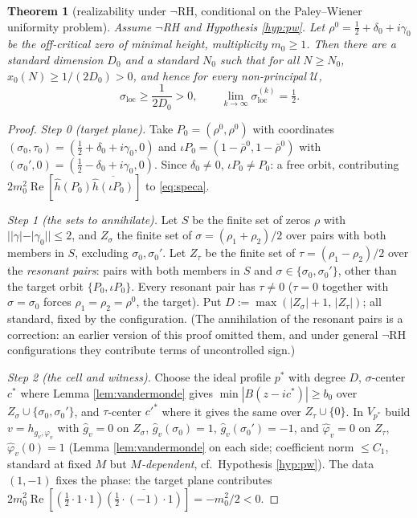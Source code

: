 \documentclass[11pt,reqno]{amsart}
\newtheorem{theorem}{Theorem}[section]
\theoremstyle{definition}
\newcommand{\half}{\tfrac12}
\begin{document}
\begin{theorem}[realizability under \(\neg\)RH, conditional on the Paley--Wiener uniformity problem]
\label{thm:realiz}
Assume \(\neg\)RH \emph{and Hypothesis \ref{hyp:pw}}. Let
\(\rho^0=\half+\delta_0+i\gamma_0\) be the off-critical
zero of minimal height, multiplicity \(m_0\geq1\). Then there are a standard
dimension \(D_0\) and a standard \(N_0\) such that for all \(N\geq N_0\),
\(x_0(N)\geq 1/(2D_0)>0\), and hence for every non-principal \(\mathcal U\),
\[
\sigma_{\mathrm{loc}}\geq\frac{1}{2D_0}>0,\qquad
\lim_{k\to\infty}\sigma_{\mathrm{loc}}^{(k)}=\tfrac12.
\]
\end{theorem}

\begin{proof}
\emph{Step 0 (target plane).} Take \(P_0=(\rho^0,\rho^0)\) with coordinates
\((\sigma_0,\tau_0)=(\half+\delta_0+i\gamma_0,0)\) and
\(\iota P_0=(1-\bar\rho^0,1-\bar\rho^0)\) with
\((\sigma_0',0)=(\half-\delta_0+i\gamma_0,0)\). Since \(\delta_0\neq0\),
\(\iota P_0\neq P_0\): a free orbit, contributing
\(2m_0^2\operatorname{Re}[\hat h(P_0)\overline{\hat h(\iota P_0)}]\) to
\eqref{eq:speca}.

\emph{Step 1 (the sets to annihilate).} Let \(S\) be the finite set of zeros
\(\rho\) with \(||\gamma|-|\gamma_0||\leq2\), and \(Z_\sigma\) the finite set of
\(\sigma=(\rho_1+\rho_2)/2\) over pairs with both members in \(S\), excluding
\(\sigma_0,\sigma_0'\). Let \(Z_\tau\) be the finite set of
\(\tau=(\rho_1-\rho_2)/2\) over the \emph{resonant pairs}: pairs with both
members in \(S\) and \(\sigma\in\{\sigma_0,\sigma_0'\}\), other than the target
orbit \(\{P_0,\iota P_0\}\). Every resonant pair has \(\tau\neq0\) (\(\tau=0\)
together with \(\sigma=\sigma_0\) forces \(\rho_1=\rho_2=\rho^0\), the target).
Put \(D:=\max(|Z_\sigma|+1,\,|Z_\tau|)\); all standard, fixed by the
configuration. \textup{(}The annihilation of the resonant pairs is a correction:
an earlier version of this proof omitted them, and under general
\(\neg\)RH configurations they contribute terms of uncontrolled
sign.\textup{)}

\emph{Step 2 (the cell and witness).} Choose the ideal profile \(p^*\) with
degree \(D\), \(\sigma\)-center \(c^*\) where Lemma \ref{lem:vandermonde} gives
\(\min|B(z-ic^*)|\geq b_0\) over \(Z_\sigma\cup\{\sigma_0,\sigma_0'\}\), and
\(\tau\)-center \(c'^*\) where it gives the same over \(Z_\tau\cup\{0\}\). In
\(V_{p^*}\) build \(v=h_{g_v,\varphi_v}\) with
\(\hat g_v=0\) on \(Z_\sigma\), \(\hat g_v(\sigma_0)=1\),
\(\hat g_v(\sigma_0')=-1\), and \(\hat\varphi_v=0\) on \(Z_\tau\),
\(\hat\varphi_v(0)=1\) (Lemma \ref{lem:vandermonde} on each side; coefficient
norm \(\leq C_1\), standard at fixed \(M\) but \emph{\(M\)-dependent}, cf.\
Hypothesis \ref{hyp:pw}). The data \((1,-1)\) fixes the
phase: the target plane contributes
\(2m_0^2\operatorname{Re}[(\half\cdot1\cdot1)\overline{(\half\cdot(-1)\cdot1)}]
=-m_0^2/2<0\).


\end{proof}
\end{document}
